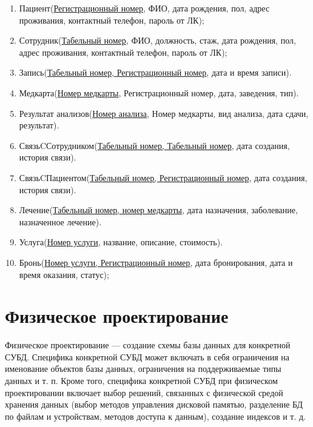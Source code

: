 \documentclass[14pt,a4paper,russian]{extreport}
\begin{document}
\begin{enumerate}
            \item Пациент(\underline{Регистрационный номер}, ФИО, дата рождения, пол, адрес
                проживания, контактный телефон, пароль от ЛК);
            \item Сотрудник(\underline{Табельный номер}, ФИО, должность, стаж, дата рождения, пол, адрес
                проживания, контактный телефон, пароль от ЛК);
            \item Запись(\underline{Табельный номер, Регистрационный номер}, дата и время записи).
            \item Медкарта(\underline{Номер медкарты}, Регистрационный номер, дата, 
                заведения, тип).
            \item Результат анализов(\underline{Номер анализа}, Номер медкарты, вид анализа, дата сдачи,
                результат).
            \item СвязьCСотрудником(\underline{Табельный номер, Табельный номер}, дата создания,
                история связи).
            \item СвязьCПациентом(\underline{Табельный номер, Регистрационный номер}, дата создания,
                история связи).
            \item Лечение(\underline{Табельный номер, номер медкарты}, дата назначения,
                заболевание, назначенное лечение).
            \item Услуга(\underline{Номер услуги}, название, описание, стоимость).
            \item Бронь(\underline{Номер услуги, Регистрационный номер}, дата бронирования, дата
                и время оказания, статус);
\end{enumerate}



\chapter{Физическое проектирование}
Физическое проектирование — создание схемы базы данных для конкретной СУБД. Специфика конкретной
СУБД может включать в себя ограничения на именование объектов базы данных, ограничения на
поддерживаемые типы данных и т. п. Кроме того, специфика конкретной СУБД при физическом
проектировании включает выбор решений, связанных с физической средой хранения данных (выбор методов
управления дисковой памятью, разделение БД по файлам и устройствам, методов доступа к данным),
создание индексов и т. д.\cite{dbdesign} 
\end{document}
